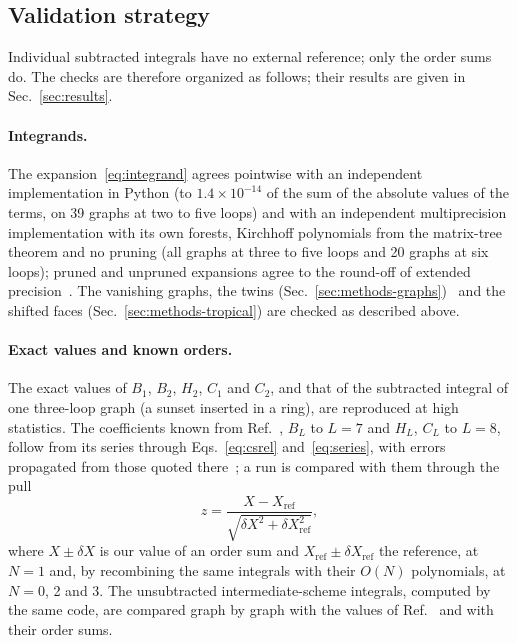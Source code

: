 \subsection{Validation strategy}
\label{sec:methods-validation}

Individual subtracted integrals have no external reference; only the order sums do. The checks are therefore organized as
follows; their results are given in Sec.~\ref{sec:results}.

\paragraph{Integrands.}
The expansion~\eqref{eq:integrand} agrees pointwise with an independent implementation in Python (to
$1.4\times10^{-14}$ of the sum of the absolute values of the terms, on 39 graphs at two to five loops) and with an
independent multiprecision implementation with its own forests, Kirchhoff polynomials from the matrix-tree theorem and no
pruning (all graphs at three to five loops and 20 graphs at six loops); pruned and unpruned expansions agree to the
round-off of extended precision~. The vanishing graphs, the twins
(Sec.~\ref{sec:methods-graphs})~ and the shifted faces
(Sec.~\ref{sec:methods-tropical}) are checked as described above.

\paragraph{Exact values and known orders.}
The exact values of $B_1$, $B_2$, $H_2$, $C_1$ and $C_2$, and that of the subtracted integral of one three-loop graph (a
sunset inserted in a ring), are reproduced at high statistics. The coefficients known from
Ref.~\cite{Phi4tools2024}, $B_L$ to $L=7$ and $H_L$, $C_L$ to $L=8$, follow from its series through
Eqs.~\eqref{eq:csrel} and~\eqref{eq:series}, with errors propagated from those quoted there~; a run is compared with them
through the pull
\begin{equation}
z=\frac{X-X_{\mathrm{ref}}}{\sqrt{\delta X^2+\delta X_{\mathrm{ref}}^2}} ,
\label{eq:pull}
\end{equation}
where $X\pm\delta X$ is our value of an order sum and $X_{\mathrm{ref}}\pm\delta X_{\mathrm{ref}}$ the reference, at
$N=1$ and, by recombining the same integrals with their $O(N)$ polynomials, at $N=0$, 2 and 3. The unsubtracted intermediate-scheme integrals, computed by the
same code, are compared graph by graph with the values of Ref.~\cite{Phi4tools2024} and with their order sums.

